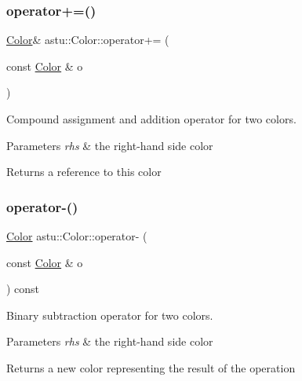 \subsubsection{\texorpdfstring{operator+=()}{operator+=()}}
{\footnotesize\ttfamily \hyperlink{classastu_1_1Color}{Color}\& astu\+::\+Color\+::operator+= (\begin{DoxyParamCaption}\item[{const \hyperlink{classastu_1_1Color}{Color} \&}]{o }\end{DoxyParamCaption})}

Compound assignment and addition operator for two colors.


\begin{DoxyParams}{Parameters}
{\em rhs} & the right-\/hand side color \\
\hline
\end{DoxyParams}
\begin{DoxyReturn}{Returns}
a reference to this color 
\end{DoxyReturn}
\mbox{\label{classastu_1_1Color_ad9b6a108bc2d6581ad97057a00d2008f}} 
\subsubsection{\texorpdfstring{operator-\/()}{operator-()}}
{\footnotesize\ttfamily \hyperlink{classastu_1_1Color}{Color} astu\+::\+Color\+::operator-\/ (\begin{DoxyParamCaption}\item[{const \hyperlink{classastu_1_1Color}{Color} \&}]{o }\end{DoxyParamCaption}) const}

Binary subtraction operator for two colors.


\begin{DoxyParams}{Parameters}
{\em rhs} & the right-\/hand side color \\
\hline
\end{DoxyParams}
\begin{DoxyReturn}{Returns}
a new color representing the result of the operation 
\end{DoxyReturn}
\mbox{\label{classastu_1_1Color_ab80bfd9e234b9caed6900afea9a0ea2e}} 
